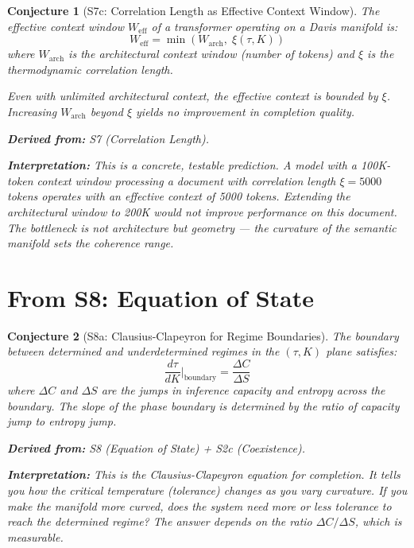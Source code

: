\documentclass[11pt,letterpaper]{article}
\newtheorem{conjecture}{Conjecture}[section]
\begin{document}
\begin{conjecture}[S7c: Correlation Length as Effective Context 
Window]\label{conj:context}
The effective context window $W_{\mathrm{eff}}$ of a transformer 
operating on a Davis manifold is:
\begin{equation}
    W_{\mathrm{eff}} = \min\left(W_{\mathrm{arch}}, \; 
    \xi(\tau, K)\right)
\end{equation}
where $W_{\mathrm{arch}}$ is the architectural context window (number of 
tokens) and $\xi$ is the thermodynamic correlation length.

Even with unlimited architectural context, the effective context is bounded 
by $\xi$. Increasing $W_{\mathrm{arch}}$ beyond $\xi$ yields no 
improvement in completion quality.

\textbf{Derived from:} S7 (Correlation Length).

\textbf{Interpretation:} This is a concrete, testable prediction. A 
model with a 100K-token context window processing a document with 
correlation length $\xi = 5000$ tokens operates with an effective context 
of 5000 tokens. Extending the architectural window to 200K would not 
improve performance on this document. The bottleneck is not architecture 
but geometry --- the curvature of the semantic manifold sets the 
coherence range.
\end{conjecture}

\newpage
\section{From S8: Equation of State}

\begin{conjecture}[S8a: Clausius-Clapeyron for Regime 
Boundaries]\label{conj:clausius}
The boundary between determined and underdetermined regimes in the 
$(\tau, K)$ plane satisfies:
\begin{equation}
    \frac{d\tau}{dK}\bigg|_{\mathrm{boundary}} 
    = \frac{\Delta C}{\Delta S}
\end{equation}
where $\Delta C$ and $\Delta S$ are the jumps in inference capacity and 
entropy across the boundary. The slope of the phase boundary is determined 
by the ratio of capacity jump to entropy jump.

\textbf{Derived from:} S8 (Equation of State) + S2c (Coexistence).

\textbf{Interpretation:} This is the Clausius-Clapeyron equation for 
completion. It tells you how the critical temperature (tolerance) changes 
as you vary curvature. If you make the manifold more curved, does the 
system need more or less tolerance to reach the determined regime? The 
answer depends on the ratio $\Delta C / \Delta S$, which is measurable.
\end{conjecture}
\end{document}
